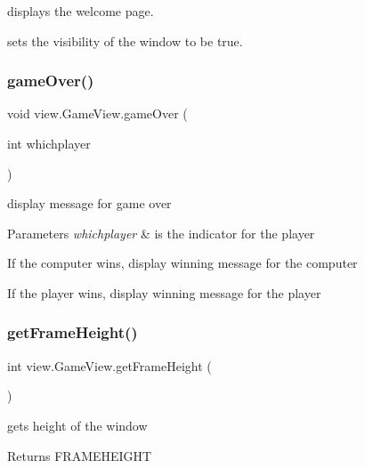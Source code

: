 displays the welcome page. 

sets the visibility of the window to be true. \hypertarget{classview_1_1_game_view_ae91ec8b4d72ed56783b2f5c84a9ff869}{}\label{classview_1_1_game_view_ae91ec8b4d72ed56783b2f5c84a9ff869} 
\subsubsection{\texorpdfstring{game\+Over()}{gameOver()}}
{\footnotesize\ttfamily void view.\+Game\+View.\+game\+Over (\begin{DoxyParamCaption}\item[{int}]{whichplayer }\end{DoxyParamCaption})}



display message for game over 


\begin{DoxyParams}{Parameters}
{\em whichplayer} & is the indicator for the player \\
\hline
\end{DoxyParams}

\begin{DoxyItemize}
\item If the computer wins, display winning message for the computer
\item If the player wins, display winning message for the player
\end{DoxyItemize}\hypertarget{classview_1_1_game_view_a741912e646a65f33e3c571002ed0cf22}{}\label{classview_1_1_game_view_a741912e646a65f33e3c571002ed0cf22} 
\subsubsection{\texorpdfstring{get\+Frame\+Height()}{getFrameHeight()}}
{\footnotesize\ttfamily int view.\+Game\+View.\+get\+Frame\+Height (\begin{DoxyParamCaption}{ }\end{DoxyParamCaption})}



gets height of the window 

\begin{DoxyReturn}{Returns}
F\+R\+A\+M\+E\+H\+E\+I\+G\+HT 
\end{DoxyReturn}
\hypertarget{classview_1_1_game_view_a729fea181bb79a2767e11f8c7be01711}{}\label{classview_1_1_game_view_a729fea181bb79a2767e11f8c7be01711} 
